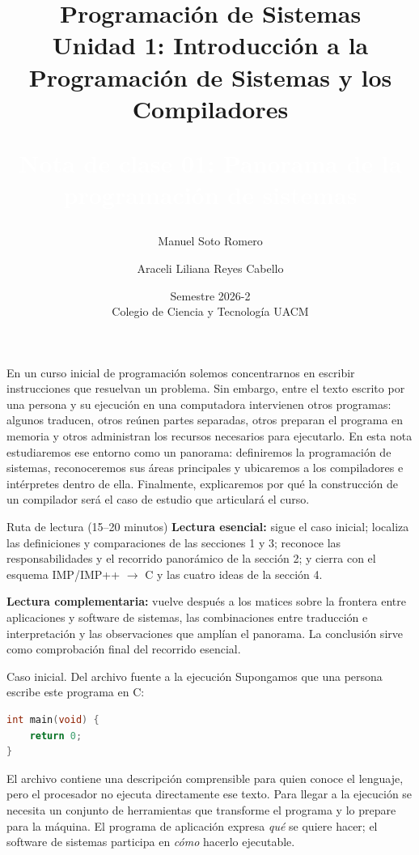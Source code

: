 \documentclass[11pt,spanish]{article}
\newcommand{\cf}[2]{%
    \colorbox{#1}{\textcolor{white}{\strut #2}}%
}
\begin{document}

\title{Programación de Sistemas\\
Unidad 1: Introducción a la Programación de Sistemas y los Compiladores\\ \bigskip
\cf{rojo7a3c3d}{\textbf{\Large Nota de clase 01: Panorama de la programación de sistemas}}}
\author{Manuel Soto Romero \and Araceli Liliana Reyes Cabello}
\date{Semestre 2026-2 \\ Colegio de Ciencia y Tecnología UACM}

\maketitle
\renewcommand*{\thefootnote}{\arabic{footnote}}
\setcounter{footnote}{0}

En un curso inicial de programación solemos concentrarnos en escribir instrucciones que resuelvan un problema. Sin embargo, entre el texto escrito por una persona y su ejecución en una computadora intervienen otros programas: algunos traducen, otros reúnen partes separadas, otros preparan el programa en memoria y otros administran los recursos necesarios para ejecutarlo. En esta nota estudiaremos ese entorno como un panorama: definiremos la programación de sistemas, reconoceremos sus áreas principales y ubicaremos a los compiladores e intérpretes dentro de ella. Finalmente, explicaremos por qué la construcción de un compilador será el caso de estudio que articulará el curso.

\begin{ruta}{Ruta de lectura (15--20 minutos)}
\textbf{Lectura esencial:} sigue el caso inicial; localiza las definiciones y comparaciones de las secciones 1 y 3; reconoce las responsabilidades y el recorrido panorámico de la sección 2; y cierra con el esquema \textsc{IMP}/\textsc{IMP++} \(\rightarrow\) \textsc{C} y las cuatro ideas de la sección 4.

\textbf{Lectura complementaria:} vuelve después a los matices sobre la frontera entre aplicaciones y software de sistemas, las combinaciones entre traducción e interpretación y las observaciones que amplían el panorama. La conclusión sirve como comprobación final del recorrido esencial.
\end{ruta}

\begin{ejemplo}{Caso inicial. Del archivo fuente a la ejecución}
Supongamos que una persona escribe este programa en \textsc{C}:

\begin{lstlisting}[language=C]
int main(void) {
    return 0;
}
\end{lstlisting}

El archivo contiene una descripción comprensible para quien conoce el lenguaje, pero el procesador no ejecuta directamente ese texto. Para llegar a la ejecución se necesita un conjunto de herramientas que transforme el programa y lo prepare para la máquina. El programa de aplicación expresa \emph{qué} se quiere hacer; el software de sistemas participa en \emph{cómo} hacerlo ejecutable.
\end{ejemplo}
\end{document}
